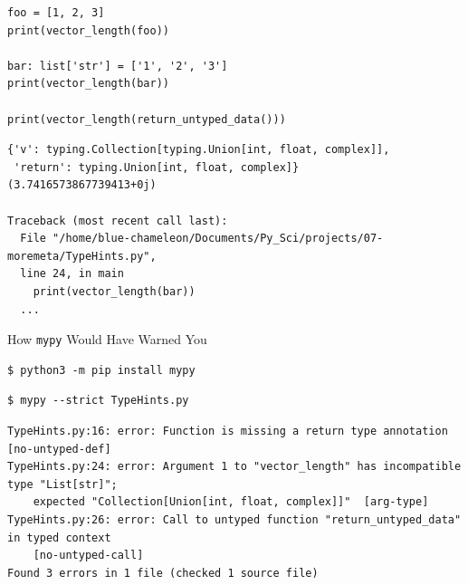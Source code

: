 
\begin{frame}[fragile]
%
\vspace{-6pt}
\begin{codebox}
\begin{verbatim}
foo = [1, 2, 3]
print(vector_length(foo))

bar: list['str'] = ['1', '2', '3']
print(vector_length(bar))

print(vector_length(return_untyped_data()))
\end{verbatim}
\end{codebox}
%
\vspace{-6pt}
\begin{cmdbox}
\begin{verbatim}
{'v': typing.Collection[typing.Union[int, float, complex]], 
 'return': typing.Union[int, float, complex]}
(3.7416573867739413+0j)

Traceback (most recent call last):
  File "/home/blue-chameleon/Documents/Py_Sci/projects/07-moremeta/TypeHints.py", 
  line 24, in main
    print(vector_length(bar))
  ...
\end{verbatim}
\end{cmdbox}
%
\end{frame}


\begin{frame}[fragile]{How \texttt{mypy} Would Have Warned You}
%
\vspace{-9pt}
\begin{cmdbox}
\begin{verbatim}
$ python3 -m pip install mypy
\end{verbatim}
\end{cmdbox}
%
\vspace{-9pt}
\begin{cmdbox}
\begin{verbatim}
$ mypy --strict TypeHints.py 
\end{verbatim}
\end{cmdbox}
%
\vspace{-9pt}
\begin{cmdbox}
\begin{verbatim}
TypeHints.py:16: error: Function is missing a return type annotation  [no-untyped-def]
TypeHints.py:24: error: Argument 1 to "vector_length" has incompatible type "List[str]"; 
    expected "Collection[Union[int, float, complex]]"  [arg-type]
TypeHints.py:26: error: Call to untyped function "return_untyped_data" in typed context
    [no-untyped-call]
Found 3 errors in 1 file (checked 1 source file)
\end{verbatim}
\end{cmdbox}
%
\end{frame}

